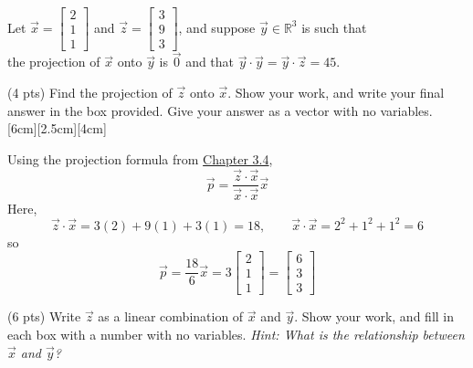 \documentclass[11pt]{article}
\begin{document}
\begin{prob}
Let $\vec x = \begin{bmatrix} 2 \\ 1 \\ 1 \end{bmatrix}$ and $\vec z = \begin{bmatrix} 3 \\ 9 \\ 3 \end{bmatrix}$, and suppose $\vec y \in \mathbb{R}^3$ is such that \\

the projection of $\vec x$ onto $\vec y$ is $\vec 0$ and that $\vec y \cdot \vec y = \vec y \cdot \vec z = 45$.

\begin{subprob}(4 pts) Find the projection of $\vec z$ onto $\vec x$. Show your work, and write your final answer in the box provided. Give your answer as a vector with no variables. \\

[6cm][2.5cm][4cm]

\begin{solution}
Using the projection formula from \href{https://notes.eecs245.org/vectors/projecting-onto-a-single-vector/}{Chapter 3.4},
\[
\vec p =
\frac{\vec{z}\cdot\vec{x}}{\vec{x}\cdot\vec{x}}\vec{x}
\]
Here,
\[
\vec{z}\cdot\vec{x}=3(2)+9(1)+3(1)=18,
\qquad
\vec{x}\cdot\vec{x}=2^2+1^2+1^2=6
\]
so
\[
\vec p
=
\frac{18}{6}\vec{x}
=
3\begin{bmatrix}2\\1\\1\end{bmatrix}
=
\begin{bmatrix}6\\3\\3\end{bmatrix}
\]
\end{solution}
\end{subprob}

\begin{subprob}(6 pts) Write $\vec z$ as a linear combination of $\vec x$ and $\vec y$. Show your work, and fill in each box with a number with no variables. \textit{Hint: What is the relationship between $\vec x$ and $\vec y$?} \\
    

\end{subprob}
\end{prob}
\end{document}
